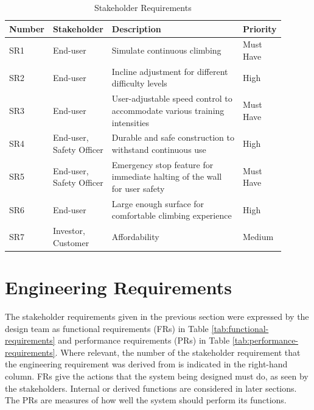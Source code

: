 \begin{table}[H]
\centering
\caption{Stakeholder Requirements}
\label{tab:stakeholder-requirements}
\begin{tabular}{|>{\centering\arraybackslash}p{0.1\linewidth}|>{\raggedright\arraybackslash}p{0.15\linewidth}|>{\raggedright\arraybackslash}p{0.55\linewidth}|>{\centering\arraybackslash}p{0.1\linewidth}|}
\hline
\textbf{Number}  & \textbf{Stakeholder} & \textbf{Description} & \textbf{Priority} \\
\hline
SR1  & End-user & Simulate continuous climbing & Must Have \\
SR2  & End-user & Incline adjustment for different difficulty levels & High \\
SR3  & End-user & User-adjustable speed control to accommodate various training intensities & Must Have \\
SR4  & End-user, Safety Officer & Durable and safe construction to withstand continuous use & High \\
SR5  & End-user, Safety Officer & Emergency stop feature for immediate halting of the wall for user safety & Must Have \\
SR6  & End-user & Large enough surface for comfortable climbing experience & High \\
SR7 & Investor, Customer & Affordability & Medium \\
\hline
\end{tabular}
\end{table}

\section{Engineering Requirements}

The stakeholder requirements given in the previous section were expressed by the design team as functional requirements (FRs) in Table \ref{tab:functional-requirements} and performance requirements (PRs) in Table \ref{tab:performance-requirements}. Where relevant, the number of the stakeholder requirement that the engineering requirement was derived from is indicated in the right-hand column. FRs give the actions that the system being designed must do, as seen by the stakeholders. Internal or derived functions are considered in later sections. The PRs are measures of how well the system should perform its functions.

